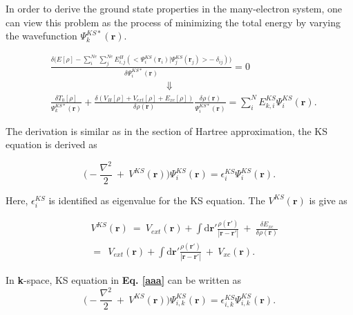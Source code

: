 \documentclass[a4paper, 12pt, titlepage,oneside,drop]{kthesis}
\begin{document}
In order to derive the ground state properties in the many-electron system, one can view this problem as the process of minimizing the total energy by varying the wavefunction $\Psi^{{KS}*}_{{k}}(\textbf{r})$. 

\begin{equation}\begin{split}\label{ks11}
& \frac{ \delta  \Big(E[\rho] - \sum\limits_{i}^{Ne} \sum\limits_{j}^{Ne} E_{i,j}^{H} (<\Psi^{{KS}}_{{i}}(\textbf{r}_i) | \Psi^{{KS}}_{{j}}(\textbf{r}_j)> -\ \delta_{ij})\Big)}{\delta \Psi^{{KS}*}_{{i}}(\textbf{r})}  = 0 \\
&  \qquad \qquad \qquad  \qquad \qquad \qquad  \Downarrow \\
& \frac{\delta T_{0}[\rho]}{\Psi^{{KS}*}_{{k}}(\textbf{r})} + \frac{\delta(V_{H}[\rho]  + V_{ext}[\rho] + E_{xc}[\rho])}{\delta \rho(\textbf{r})} \frac{\delta \rho(\textbf{r})}{\Psi^{{KS}*}_{{i}}(\textbf{r})} 
= \sum\limits_i^{{N}} E_{k,i}^{KS} \Psi^{{KS}}_{{i}}(\textbf{r}).
\end{split}
\end{equation}


The derivation is similar as in the section of Hartree approximation, the KS equation is derived as 

\begin{equation}\label{aaa}
 \Big(-\frac{\nabla^{2}}{2}\ + \ V^{KS}(\textbf{r})\Big) \Psi^{{KS}}_{{i}}(\textbf{r}) = \epsilon^{{KS}}_{{i}} \Psi^{{KS}}_{{i}}(\textbf{r}).
\end{equation}

Here, $\epsilon^{{KS}}_{{i}}$ is identified as eigenvalue for the KS equation. The $V^{KS}(\textbf{r})$ is give as

\begin{equation}\begin{split}\label{xiahunao}
&\ V^{KS}(\textbf{r}) \ = \ V_{ext}(\textbf{r}) + \int \mathrm{d}{\textbf{r}'}  \frac{\rho(\textbf{r}')}{|{\textbf{r}}-{\textbf{r}}'|} \ + \ \frac{\delta{E_{xc}}}{\delta{\rho(\textbf{r})}} \\
&\ = \ \ V_{ext}(\textbf{r}) + \int \mathrm{d}{\textbf{r}'}  \frac{\rho(\textbf{r}')}{|{\textbf{r}}-{\textbf{r}}'|} \ + \ V_{xc}(\textbf{r}).
\end{split}
\end{equation}

In \textbf{k}-space, KS equation in \textbf{Eq. \ref{aaa}} can be written as
\begin{equation}\label{aaa111}
 \Big(-\frac{\nabla^{2}}{2}\ + \ V^{KS}(\textbf{r})\Big) \Psi^{{KS}}_{{i,k}}(\textbf{r}) = \epsilon^{{KS}}_{{i,k}} \Psi^{{KS}}_{{i,k}}(\textbf{r}).
\end{equation}
\end{document}
